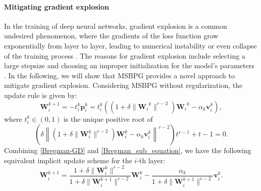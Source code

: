 \documentclass[twoside,11pt]{article}
\newcommand{\be}{\begin{equation}}
\newcommand{\ee}{\end{equation}}
\def\vg{{\bm{g}}}
\def\vp{{\bm{p}}}
\def\vv{{\bm{v}}}
\def\mW{{\bm{W}}}
\begin{document}




\paragraph{Mitigating gradient explosion}
In the training of deep neural networks, gradient explosion is a common undesired phenomenon, where the gradients of the loss function grow exponentially from layer to layer, leading to numerical instability or even collapse of the training process \citep{hochreiter1991untersuchungen,manchev2020target}. The reasons for gradient explosion include selecting a large stepsize and choosing an improper initialization for the model's parameters \citep{pascanu2013difficulty}. In the following, we will show that MSBPG  provides a novel approach to mitigate gradient explosion. Considering MSBPG  without regularization, the update rule is given by:
\be
{\mW}_i^{k+1}=-t_i^k\vp_i^k=t_i^k\left((1+\delta\|{\mW_i}^k\|^{r-2}){\mW_i}^k-\alpha_k\vv_i^k\right),
\label{Bregman-GD}
\ee
where $t_i^k\in(0,1)$ is the unique positive root of 
\be 
\left(\delta\left\|(1+\delta\|{\mW}_i^k\|^{r-2}){\mW}_i^k-\alpha_k\vv_i^k\right\|^{r-2}\right)t^{r-1}+t-1=0.
\label{Bregman_sub_equation}
\ee
Combining \eqref{Bregman-GD} and \eqref{Bregman_sub_equation}, we have the following equivalent implicit update scheme for the $i$-th layer:
\be
\mW_i^{k+1}=\frac{1+\delta\|\mW_i^k\|^{r-2}}{1+\delta\|\mW_i^{k+1}\|^{r-2}}\mW_i^k-\frac{\alpha_k}{1+\delta\|\mW_i^{k+1}\|^{r-2}}\vv_i^k.
\label{implicit-sbpg}
\ee
\end{document}

